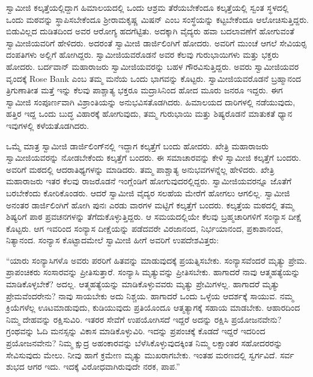  ಸ್ವಾಮೀಜಿ ಕಲ್ಕತ್ತೆಯಲ್ಲಿದ್ದಾಗ ಹಿಮಾಲಯದಲ್ಲಿ ಒಂದು ಆಶ್ರಮ ತೆರೆಯಬೇಕೆಂದೂ ಕಲ್ಕತ್ತೆಯಲ್ಲಿ ಸ್ವಂತ ಸ್ಥಳದಲ್ಲಿ ಒಂದು ಮಠವನ್ನು ಸ್ಥಾಪಿಸಬೇಕೆಂದೂ ಶ‍್ರೀರಾಮಕೃಷ್ಣ ಮಿಷನ್ ಎಂಬ ಸಂಸ್ಥೆಯನ್ನು ಕಟ್ಟಬೇಕೆಂದೂ ಆಲೋಚಿಸುತ್ತಿದ್ದರು. ಬಿಡುವಿಲ್ಲದ ದುಡಿತದಿಂದ ಅವರ ಆರೋಗ್ಯ ಹದಗೆಟ್ಟಿತು. ಅದಕ್ಕಾಗಿ ವೈದ್ಯರು ಹವಾ ಬದಲಾವಣೆಗೆ ಹೋಗುವಂತೆ ಸ್ವಾಮೀಜಿಯವರಿಗೆ ಹೇಳಿದರು. ಅದರಂತೆ ಸ್ವಾಮೀಜಿ ಡಾರ್ಜಿಲಿಂಗಿಗೆ ಹೋದರು. ಅವರಿಗೆ ಮುಂಚೆ ಆಗಲೆ ಸೇವಿಯರ‍್ಸ ದಂಪತಿಗಳು ಅಲ್ಲಿಗೆ ಹೋಗಿದ್ದರು. ಸ್ವಾಮೀಜಿಯವರೊಡನೆ ಅವರ ಕೆಲವು ಗುರುಭಾಯಿಗಳು ಮತ್ತು ಭಕ್ತರು ಹೋದರು. ಬರ್ದವಾನ್ ಮಹಾರಾಜರು ಸ್ವಾಮೀಜಿಯವರನ್ನು ಬಹಳ ಗೌರವಿಸುತ್ತಿದ್ದರು. ಅವರು ಸ್ವಾಮೀಜಿಯವರ ವೃಂದಕ್ಕೆ Rose Bank ಎಂಬ ತಮ್ಮ ಮನೆಯ ಒಂದು ಭಾಗವನ್ನು ಕೊಟ್ಟರು. ಸ್ವಾಮೀಜಿಯವರೊಡನೆ ಬ್ರಹ್ಮಾನಂದ ತ್ರಿಗುಣಾತೀತ ಮತ್ತೆ ಇನ್ನು ಕೆಲವು ಪಾಶ್ಚಾತ್ಯ ಭಕ್ತರೂ ಮದ್ರಾಸಿನಿಂದ ಹೋದ ಮೂರು ಜನರೂ ಇದ್ದರು. ಈಗ ಸ್ವಾಮೀಜಿ ಸಂಪೂರ್ಣವಾಗಿ ವಿಶ್ರಾಂತಿಯನ್ನು ಅನುಭವಿಸತೊಡಗಿದರು. ಹಿಮಾಲಯದ ದಾರಿಗಳಲ್ಲಿ ನಡೆಯುವುದು, ಹತ್ತಿರ ಇದ್ದ ಒಂದು ಬುದ್ಧ ವಿಹಾರಕ್ಕೆ ಹೋಗುವುದು, ತಮ್ಮ ಗುರುಭಾಯಿ ಮತ್ತು ಶಿಷ್ಯರೊಡನೆ ಮಾತುಕತೆ ಧ್ಯಾನ ಇವುಗಳಲ್ಲಿ ಕಳೆಯತೊಡಗಿದರು. 

 ಒಮ್ಮೆ ಮಾತ್ರ ಸ್ವಾಮೀಜಿ ಡಾರ್ಜಿಲಿಂಗ್‍ನಲ್ಲಿ ಇದ್ದಾಗ ಕಲ್ಕತ್ತೆಗೆ ಬಂದು ಹೋದರು. ಖೇತ್ರಿ ಮಹಾರಾಜರು ಸ್ವಾಮೀಜಿಯವರನ್ನು ನೋಡಬೇಕೆಂದು ಕಲ್ಕತ್ತೆಗೆ ಬಂದರು. ಈ ಸಮಾಚಾರವನ್ನು ಕೇಳಿ ಸ್ವಾಮೀಜಿ ಕಲ್ಕತ್ತೆಗೆ ಬಂದರು. ಅವರಿಗೆ ಮಠದಲ್ಲಿ ಆದರಾತಿಥ್ಯಗಳನ್ನು ಮಾಡಿದರು. ತಮ್ಮ ಪಾಶ್ಚಾತ್ಯ ಅನುಭವಗಳನ್ನೆಲ್ಲ ಹೇಳಿದರು. ಖೇತ್ರಿ ಮಹಾರಾಜರು ಇತರ ಕೆಲವು ರಾಜರೊಡನೆ ಇಂಗ್ಲೆಂಡಿಗೆ ಹೋಗುವುದರಲ್ಲಿದ್ದರು. ಸ್ವಾಮೀಜಿಯವರನ್ನೂ ಜೊತೆಗೆ ಬರಬೇಕೆಂದು ಕೋರಿಕೊಂಡರು. ಆದರೆ ಸ್ವಾಮೀಜಿ ವೈದ್ಯರ ಸಲಹೆಯ ಮೇರೆಗೆ ಹೋಗಲು ಆಗಲಿಲ್ಲ. ಸ್ವಾಮೀಜಿ ಅನಂತರ ಡಾರ್ಜಿಲಿಂಗಿಗೆ ಹೋಗಿ ಪುನಃ ಎರಡು ವಾರಗಳ ಮಟ್ಟಿಗೆ ಕಲ್ಕತ್ತೆಗೆ ಬಂದರು. ಕಲ್ಕತ್ತೆಯ ಮಠದಲ್ಲಿ ತಮ್ಮ ಶಿಷ್ಯರಿಗೆ ಪಾಠ ಪ್ರವಚನಗಳನ್ನು ತೆಗೆದುಕೊಳ್ಳುತ್ತಿದ್ದರು. ಆ ಸಮಯದಲ್ಲಿಯೇ ಕೆಲವು ಬ್ರಹ್ಮಚಾರಿಗಳಿಗೆ ಸಂನ್ಯಾಸ ದೀಕ್ಷೆ ಕೊಟ್ಟರು. ಆಗ ಇವರಿಂದ ಸಂನ್ಯಾಸ ದೀಕ್ಷೆಯನ್ನು ಪಡೆದವರೇ ವಿರಜಾನಂದ, ನಿರ್ಭಯಾನಂದ, ಪ್ರಕಾಶಾನಂದ, ನಿತ್ಯಾನಂದ. ಸಂನ್ಯಾಸ ಕೊಟ್ಟಾದಮೇಲೆ ಸ್ವಾಮೀಜಿ ಹೀಗೆ ಅವರಿಗೆ ಉಪದೇಶವಿತ್ತರು: 

 “ಯಾರು ಸಂನ್ಯಾಸಿಗಳೊ ಅವರು ಪರರಿಗೆ ಹಿತವನ್ನು ಮಾಡುವುದಕ್ಕೆ ಪ್ರಯತ್ನಿಸಬೇಕು. ಸಂನ್ಯಾಸವೆಂದರೆ ಮೃತ್ಯು ಪ್ರೇಮ. ಪ್ರಾಪಂಚಿಕರು ಸಂಸಾರವನ್ನು ಪ್ರೀತಿಸುತ್ತಾರೆ. ಸಂನ್ಯಾಸಿ ಮೃತ್ಯುವನ್ನು ಪ್ರೀತಿಸಬೇಕು. ಹಾಗಾದರೆ ನಾವು ಆತ್ಮಹತ್ಯೆಯನ್ನು ಮಾಡಿಕೊಳ್ಳಬೇಕೆ? ಅದಲ್ಲ. ಆತ್ಮಹತ್ಯೆಯನ್ನು ಮಾಡಿಕೊಳ್ಳುವವರು ಮೃತ್ಯು ಪ್ರೇಮಿಗಳಲ್ಲ. ಹಾಗಾದರೆ ಮೃತ್ಯು ಪ್ರೇಮವೆಂದರೇನು? ನಾವು ಸಾಯಬೇಕು ಅದು ನಿಶ್ಚಯ. ಹಾಗಾದರೆ ಒಂದು ಒಳ್ಳೆಯ ಆದರ್ಶಕ್ಕೆ ಸಾಯುವ. ನಮ್ಮ ಕ್ರಿಯೆಗಳೆಲ್ಲ ಊಟಮಾಡುವುದು, ಕುಡಿಯುವುದು ಪ್ರತಿಯೊಂದೂ ಆತ್ಮತ್ಯಾಗಕ್ಕೆ ಸಹಾಯ ಮಾಡಬೇಕು. ಆಹಾರದಿಂದ ನಿಮ್ಮ ದೇಹವನ್ನು ರಕ್ಷಿಸುವಿರಿ. ಇತರರ ಸೇವೆಗೆ ಉಪಯೋಗಿಸದೆ ಇದ್ದರೆ ಅದನ್ನು ರಕ್ಷಿಸಿ ಪ್ರಯೋಜನವೇನು? ಗ್ರಂಥವನ್ನು ಓದಿ ಮನಸ್ಸನ್ನು ವಿಕಾಸ ಮಾಡಿಕೊಳ್ಳುವಿರಿ. ಇದನ್ನು ಪ್ರಪಂಚಕ್ಕೆ ಕೊಡದೆ ಇದ್ದರೆ ಇದರಿಂದ ಪ್ರಯೋಜನವೇನು? ನಿಮ್ಮ ಕ್ಷುದ್ರ ಅಹಂಕಾರವನ್ನು ಬೆಳೆಸಿಕೊಳ್ಳುವುದಕ್ಕಿಂತ ನಿಮ್ಮ ಲಕ್ಷಾಂತರ ಸಹೋದರರನ್ನು ಸೇವಿಸುವುದು ಮೇಲು. ನೀವು ಹಾಗೆ ಕ್ರಮೇಣ ಮೃತ್ಯು ಮುಖರಾಗಬೇಕು. ಇಂತಹ ಮರಣದಲ್ಲಿ ಸ್ವರ್ಗವಿದೆ. ಸರ್ವ ಶುಭದ ಆಗರ ಇದು. ಇದಕ್ಕೆ ವಿರೋಧವಾಗಿರುವುದೇ ನರಕ, ಪಾಪ.” 

